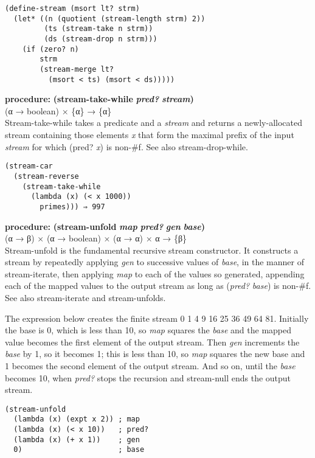 \begin{verbatim}
(define-stream (msort lt? strm)
  (let* ((n (quotient (stream-length strm) 2))
         (ts (stream-take n strm))
         (ds (stream-drop n strm)))
    (if (zero? n)
        strm
        (stream-merge lt?
          (msort < ts) (msort < ds)))))
\end{verbatim}

\textbf{procedure:} \textbf{(stream-take-while} \textbf{\emph{pred?}}
\textbf{} \textbf{\emph{stream})}\\
(α → boolean) × \{α\} → \{α\}\\
Stream-take-while takes a predicate and a \emph{stream} and returns a
newly-allocated stream containing those elements \emph{x} that form the
maximal prefix of the input \emph{stream} for which (pred? \emph{x}) is
non-\#f. See also stream-drop-while.

\begin{verbatim}
(stream-car
  (stream-reverse
    (stream-take-while
      (lambda (x) (< x 1000))
        primes))) ⇒ 997
\end{verbatim}

\textbf{procedure:} \textbf{(stream-unfold} \textbf{\emph{map}}
\textbf{} \textbf{\emph{pred?}} \textbf{} \textbf{\emph{gen}} \textbf{}
\textbf{\emph{base})}\\
(α → β) × (α → boolean) × (α → α) × α → \{β\}\\
Stream-unfold is the fundamental recursive stream constructor. It
constructs a stream by repeatedly applying \emph{gen} to successive
values of \emph{base}, in the manner of stream-iterate, then applying
\emph{map} to each of the values so generated, appending each of the
mapped values to the output stream as long as (\emph{pred?} \emph{base})
is non-\#f. See also stream-iterate and stream-unfolds.

The expression below creates the finite stream 0 1 4 9 16 25 36 49 64
81. Initially the base is 0, which is less than 10, so \emph{map}
squares the \emph{base} and the mapped value becomes the first element
of the output stream. Then \emph{gen} increments the \emph{base} by 1,
so it becomes 1; this is less than 10, so \emph{map} squares the new
base and 1 becomes the second element of the output stream. And so on,
until the \emph{base} becomes 10, when \emph{pred?} stops the recursion
and stream-null ends the output stream.

\begin{verbatim}
(stream-unfold
  (lambda (x) (expt x 2)) ; map
  (lambda (x) (< x 10))   ; pred?
  (lambda (x) (+ x 1))    ; gen
  0)                      ; base
\end{verbatim}

